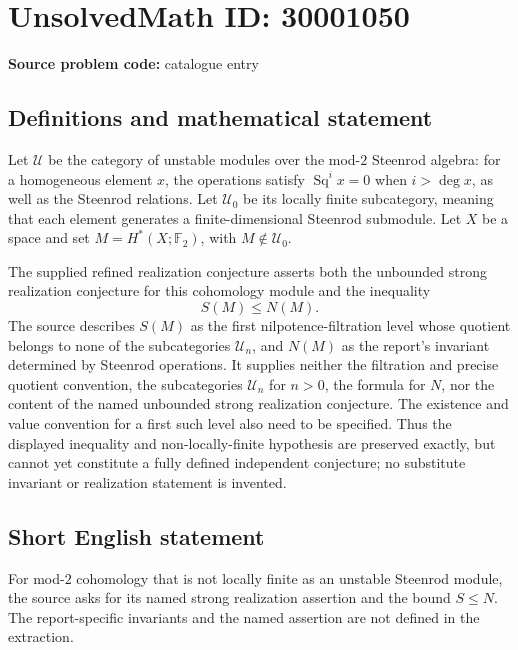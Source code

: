 \documentclass[11pt]{article}
\newcommand{\F}{\mathbb{F}}
\begin{document}
\section*{UnsolvedMath ID: 30001050}
\textbf{Source problem code:} catalogue entry
\subsection{Definitions and mathematical statement}
Let \(\mathcal U\) be the category of unstable modules over the mod-\(2\) Steenrod algebra: for a homogeneous element \(x\), the operations satisfy \(\operatorname{Sq}^i x=0\) when \(i>\deg x\), as well as the Steenrod relations. Let \(\mathcal U_0\) be its locally finite subcategory, meaning that each element generates a finite-dimensional Steenrod submodule. Let \(X\) be a space and set \(M=H^*(X;\F_2)\), with \(M\notin\mathcal U_0\).

The supplied refined realization conjecture asserts both the unbounded strong realization conjecture for this cohomology module and the inequality
\[
S(M)\leq N(M).
\]
The source describes \(S(M)\) as the first nilpotence-filtration level whose quotient belongs to none of the subcategories \(\mathcal U_n\), and \(N(M)\) as the report's invariant determined by Steenrod operations. It supplies neither the filtration and precise quotient convention, the subcategories \(\mathcal U_n\) for \(n>0\), the formula for \(N\), nor the content of the named unbounded strong realization conjecture. The existence and value convention for a first such level also need to be specified. Thus the displayed inequality and non-locally-finite hypothesis are preserved exactly, but cannot yet constitute a fully defined independent conjecture; no substitute invariant or realization statement is invented.
\subsection{Short English statement}
For mod-\(2\) cohomology that is not locally finite as an unstable Steenrod module, the source asks for its named strong realization assertion and the bound \(S\leq N\). The report-specific invariants and the named assertion are not defined in the extraction.
\end{document}
